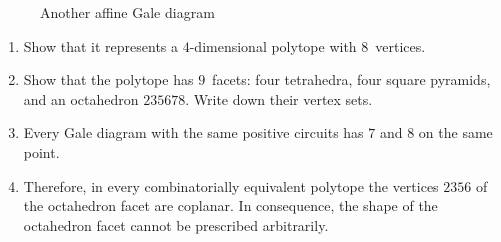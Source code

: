 \documentclass[11pt]{amsart}
\begin{document}
\begin{enumerate}
\begin{figure}[htbp]
    \caption{Another affine Gale diagram}
    \label{fig:Gale2}
  \end{figure}
  \begin{enumerate}
  \item
    Show that it represents a $4$-dimensional polytope with $8$~vertices.
  \item
    Show that the polytope has $9$~facets: four tetrahedra, four square pyramids, and an octahedron $235678$.
    Write down their vertex sets.
  \item
    Every Gale diagram with the same positive circuits has $7$ and $8$ on the same point.
  \item
    Therefore, in every combinatorially equivalent polytope the vertices $2356$ of the octahedron facet are coplanar.
    In consequence, the shape of the octahedron facet cannot be prescribed arbitrarily.
    
  \end{enumerate}
\end{enumerate}
\end{document}
